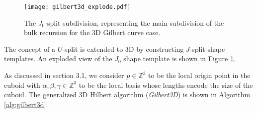 \begin{figure}[h]
  \centering
  \texttt{[image: gilbert3d\_explode.pdf]}
  \caption{ The $J_0$-split subdivision, representing the main subdivision of the bulk recursion for the 3D Gilbert curve case. }
  \label{fig:gilbert3DJSplit}
\end{figure}


The concept of a $U$-split is extended to 3D by constructing $J$-split shape templates.
An exploded view of the $J_0$ shape template is shown in Figure \ref{fig:gilbert3DJSplit}.

As discussed in section 3.1, we consider $p \in \mathbb{Z}^3$ to be the local origin point in the cuboid with
$\alpha, \beta, \gamma \in \mathbb{Z}^3$ to be the local basis whose lengths encode the size of the cuboid.
The generalized 3D Hilbert algorithm (\textit{Gilbert3D}) is shown in Algorithm \ref{alg:gilbert3d}.




